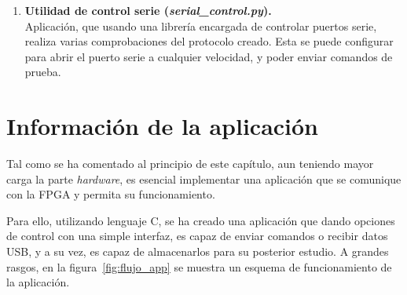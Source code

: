 \begin{enumerate}
    \item \textbf{Utilidad de control serie (\emph{serial\_control.py}).} \\
    Aplicación, que usando una librería encargada de controlar puertos serie, realiza varias comprobaciones del protocolo creado. Esta se puede configurar para abrir el puerto serie a cualquier velocidad, y poder enviar comandos de prueba.
\end{enumerate}

\section{Información de la aplicación}
Tal como se ha comentado al principio de este capítulo, aun teniendo mayor carga la parte \emph{hardware}, es esencial implementar una aplicación que se comunique con la FPGA y permita su funcionamiento.

Para ello, utilizando lenguaje C, se ha creado una aplicación que dando opciones de control con una simple interfaz, es capaz de enviar comandos o recibir datos USB, y a su vez, es capaz de almacenarlos para su posterior estudio. A grandes rasgos, en la figura~\ref{fig:flujo_app} se muestra un esquema de funcionamiento de la aplicación.

